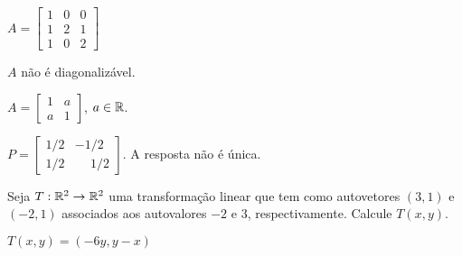 \documentclass[12pt]{exam}
\begin{document}
\begin{exercicio}
    $A = \begin{bmatrix} 1 & 0 & 0\\ 1 & 2 & 1\\ 1 & 0 & 2\end{bmatrix}$

    \begin{solucao}
        $A$ não é diagonalizável.
    \end{solucao}
\end{exercicio}

\begin{exercicio}\label{fimacharmatrizquediagonalizacao}
    $A = \begin{bmatrix} 1 & a \\ a & 1\end{bmatrix}$, $a \in \mathbb{R}$.

    \begin{solucao}
        $P = \begin{bmatrix} 1/2 & -1/2\\ 1/2 & \phantom{-} 1/2\end{bmatrix}$. A resposta não é única.
    \end{solucao}
\end{exercicio}

\begin{exercicio}
  Seja $T : \mathbb{R}^2 \to \mathbb{R}^2$ uma transformação linear que tem como autovetores $(3,1)$ e $(-2,1)$ associados aos autovalores $-2$ e $3$, respectivamente. Calcule $T(x,y)$.
  \begin{solucao}
    $T(x,y) = (-6y, y -x)$
  \end{solucao}
\end{exercicio}
\end{document}
